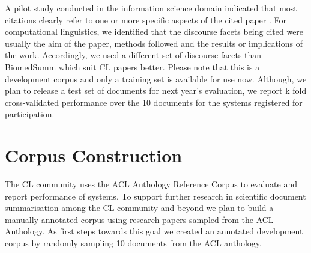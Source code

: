 \documentclass[11pt]{article}
\begin{document}

A pilot study conducted in the information science domain indicated that 
most citations clearly refer to one or more specific aspects of the cited 
paper \cite{jaidka2013}. For computational linguistics, we identified that 
the discourse facets being cited were usually the aim of the paper, methods 
followed and the results or implications of the work. Accordingly, we used a 
different set of discourse facets than BiomedSumm which suit CL papers better. 
Please note that this is a development corpus and only a training set is 
available for use now. Although, we plan to release a test set of documents 
for next year's evaluation, we report k fold cross-validated performance over 
the 10 documents for the systems registered for participation.

\section{Corpus Construction}
\label{corpus}
The CL community uses the ACL Anthology Reference Corpus \cite{bird2008} 
to evaluate and report performance of systems. To support further research 
in scientific document summarisation among the CL community and beyond we 
plan to build a manually annotated corpus using research papers sampled 
from the ACL Anthology. As first steps towards this goal we created an 
annotated development corpus by randomly sampling 10 documents from the 
ACL anthology. 
\end{document}
